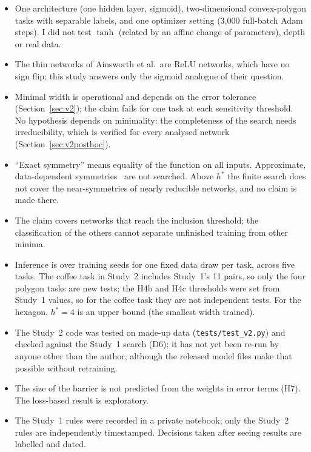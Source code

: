 \documentclass[11pt]{article}
\begin{document}
\begin{itemize}[leftmargin=*]
\item One architecture (one hidden layer, sigmoid), two-dimensional convex-polygon tasks with separable labels, and one optimizer setting (3{,}000 full-batch Adam steps). I did not test $\tanh$ (related by an affine change of parameters), depth or real data.
\item The thin networks of Ainsworth et al.\ are ReLU networks, which have no sign flip; this study answers only the sigmoid analogue of their question.
\item Minimal width is operational and depends on the error tolerance (Section~\ref{sec:v2}); the claim fails for one task at each sensitivity threshold. No hypothesis depends on minimality: the completeness of the search needs irreducibility, which is verified for every analysed network (Section~\ref{sec:v2posthoc}).
\item ``Exact symmetry'' means equality of the function on all inputs. Approximate, data-dependent symmetries~\cite{burgin2026beyond} are not searched. Above $h^*$ the finite search does not cover the near-symmetries of nearly reducible networks, and no claim is made there.
\item The claim covers networks that reach the inclusion threshold; the classification of the others cannot separate unfinished training from other minima.
\item Inference is over training seeds for one fixed data draw per task, across five tasks. The coffee task in Study~2 includes Study~1's 11 pairs, so only the four polygon tasks are new tests; the H4b and H4c thresholds were set from Study~1 values, so for the coffee task they are not independent tests. For the hexagon, $h^* = 4$ is an upper bound (the smallest width trained).
\item The Study~2 code was tested on made-up data (\texttt{tests/test\_v2.py}) and checked against the Study~1 search (D6); it has not yet been re-run by anyone other than the author, although the released model files make that possible without retraining.
\item The size of the barrier is not predicted from the weights in error terms (H7). The loss-based result is exploratory.
\item The Study~1 rules were recorded in a private notebook; only the Study~2 rules are independently timestamped. Decisions taken after seeing results are labelled and dated.
\end{itemize}
\end{document}

